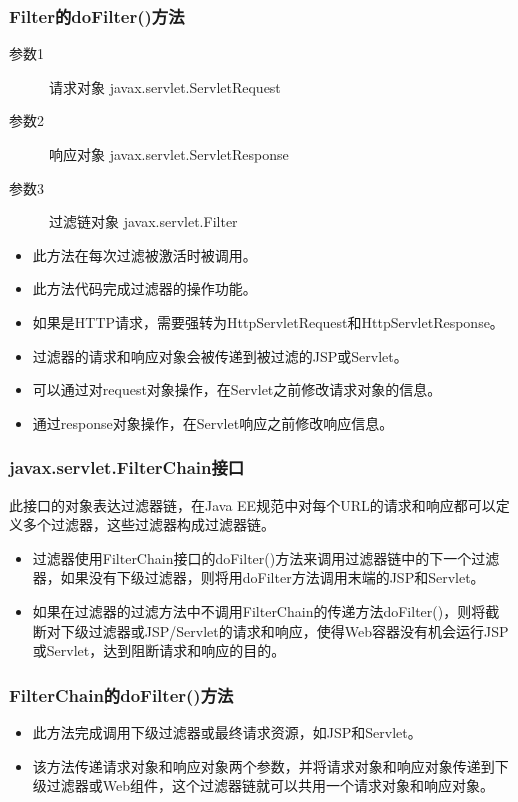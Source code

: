 \begin{frame}[fragile] %
\frametitle{Filter的doFilter()方法} 

\begin{description}
\item[参数1] 请求对象 javax.servlet.ServletRequest
\item[参数2] 响应对象 javax.servlet.ServletResponse
\item[参数3] 过滤链对象 javax.servlet.Filter
\end{description}

\begin{itemize}
\item 此方法在每次过滤被激活时被调用。
\item 此方法代码完成过滤器的操作功能。
\item 如果是HTTP请求，需要强转为HttpServletRequest和HttpServletResponse。
\item 过滤器的请求和响应对象会被传递到被过滤的JSP或Servlet。
\item 可以通过对request对象操作，在Servlet之前修改请求对象的信息。
\item 通过response对象操作，在Servlet响应之前修改响应信息。
\end{itemize}
\end{frame}



\begin{frame}[fragile] %
\frametitle{javax.servlet.FilterChain接口} 

此接口的对象表达过滤器链，在Java EE规范中对每个URL的请求和响应都可以定义多个过滤器，这些过滤器构成过滤器链。
\begin{itemize}\kai
\item 过滤器使用FilterChain接口的doFilter()方法来调用过滤器链中的下一个过滤器，如果没有下级过滤器，则将用doFilter方法调用末端的JSP和Servlet。
\item 如果在过滤器的过滤方法中不调用FilterChain的传递方法doFilter()，则将截断对下级过滤器或JSP/Servlet的请求和响应，使得Web容器没有机会运行JSP或Servlet，达到阻断请求和响应的目的。
\end{itemize}
\end{frame}

\begin{frame}[fragile] %
\frametitle{FilterChain的doFilter()方法} 


\begin{itemize}
\item 此方法完成调用下级过滤器或最终请求资源，如JSP和Servlet。
\item 该方法传递请求对象和响应对象两个参数，并将请求对象和响应对象传递到下级过滤器或Web组件，这个过滤器链就可以共用一个请求对象和响应对象。
\end{itemize}
\end{frame}

